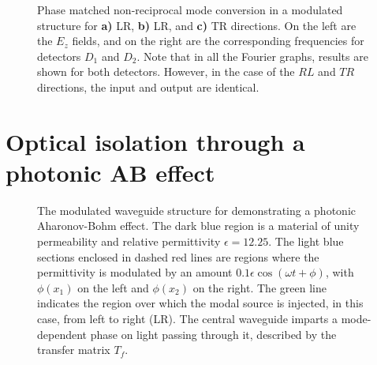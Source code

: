 \begin{figure}[t]
	\centering
	\setlength{\figH}{0.4\textwidth}
	\setlength{\figW}{\textwidth}
	\begin{subfigure}[t]{0.5\textwidth}
		
	\end{subfigure}%
	\begin{subfigure}[t]{0.5\textwidth}
		
	\end{subfigure}
	\caption[Non-reciprocal frequency conversion in a strongly modulated waveguide]{Phase matched non-reciprocal mode conversion in a modulated structure for \textbf{a)} LR, \textbf{b)} LR, and \textbf{c)} TR directions. On the left are the $E_z$ fields, and on the right are the corresponding frequencies for detectors $D_1$ and $D_2$. Note that in all the Fourier graphs, results are shown for both detectors. However, in the case of the $RL$ and $TR$ directions, the input and output are identical.}
	\label{fig:bandyu}
\end{figure} 


\section{Optical isolation through a photonic AB effect}
\label{sec:opticAB}

\begin{figure}[t!]
	\centering
	\setlength{\figH}{1\textwidth}
	\setlength{\figW}{1\textwidth}
	\caption[Waveguide for demonstrating a photonic AB effect]{The modulated waveguide structure for demonstrating a photonic Aharonov-Bohm effect. The dark blue region is a material of unity permeability and relative permittivity $\epsilon = 12.25$. The light blue sections enclosed in dashed red lines are regions where the permittivity is modulated by an amount $0.1 \epsilon \cos(\omega t + \phi)$, with $\phi(x_1)$ on the left and $\phi(x_2)$ on the right. The green line indicates the region over which the modal source is injected, in this case, from left to right (LR). The central waveguide imparts a mode-dependent phase on light passing through it, described by the transfer matrix $T_f$.}%
	\label{fig:abcavity}
\end{figure}

